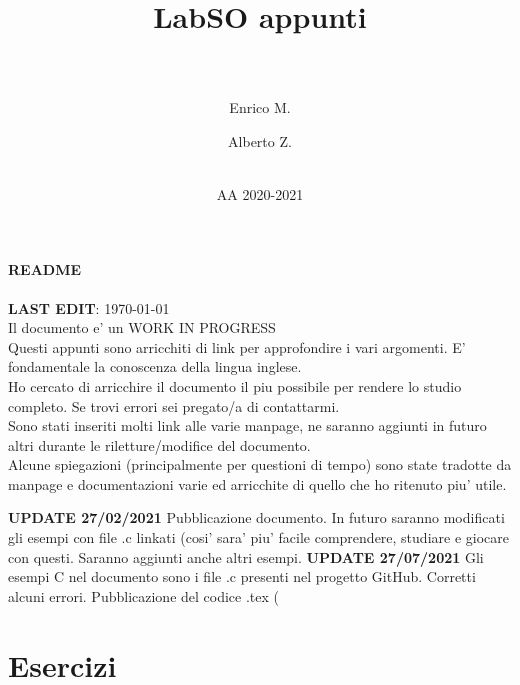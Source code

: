 \documentclass[a4paper]{article}
\title{\huge LabSO appunti\par}
\author{\makebox[.9\textwidth]{\Large Ettore Saggiorato\par}\\ \and Enrico M.\\ \and Alberto Z.\\ \\  %
}
\date{AA 2020-2021}
\begin{document}
\lstset{style=C_code}
\maketitle
\clearpage


\paragraph{README} 
\textbf{LAST EDIT}: \today
\\
Il documento e' un WORK IN PROGRESS
\\
Questi appunti sono arricchiti di link per approfondire i vari argomenti. E' fondamentale la conoscenza della lingua inglese.\\
Ho cercato di arricchire il documento il piu possibile per rendere lo studio completo. Se trovi errori sei pregato/a di contattarmi. \\
Sono stati inseriti molti link alle varie manpage, ne saranno aggiunti in futuro altri durante le riletture/modifice del documento. \\
Alcune spiegazioni (principalmente per questioni di tempo) sono state tradotte da manpage e documentazioni varie ed arricchite di quello che ho ritenuto piu' utile.\\\break{}

\textbf{UPDATE 27/02/2021} Pubblicazione documento. In futuro saranno modificati gli esempi con file .c linkati (cosi' sara' piu' facile comprendere, studiare e giocare con questi. Saranno aggiunti anche altri esempi.\break{}
\textbf{UPDATE 27/07/2021} Gli esempi C nel documento sono i file .c presenti nel progetto GitHub. Corretti alcuni errori. Pubblicazione del codice .tex (

\clearpage
\tableofcontents
\clearpage
{}

\clearpage

\clearpage

\clearpage

\clearpage



\clearpage
\section{Esercizi}
\end{document}
